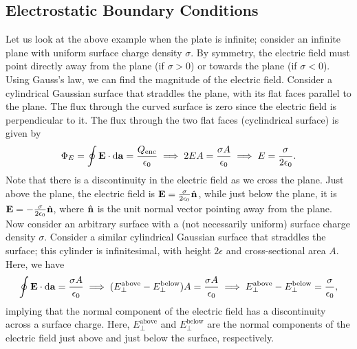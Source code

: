 \subsection{Electrostatic Boundary Conditions}

Let us look at the above example when the plate is infinite; consider an infinite plane with uniform surface charge density $\sigma$. By symmetry, the electric field must point directly away from the plane (if $\sigma > 0$) or towards the plane (if $\sigma < 0$). Using Gauss's law, we can find the magnitude of the electric field. Consider a cylindrical Gaussian surface that straddles the plane, with its flat faces parallel to the plane. The flux through the curved surface is zero since the electric field is perpendicular to it. The flux through the two flat faces (cyclindrical surface) is given by
\begin{align}
    \Phi_{E} = \oint \mathbf{E} \cdot \mathrm{d}\mathbf{a} = \frac{Q_{\text{enc}}}{\epsilon_{0}} \implies 2 E A = \frac{\sigma A}{\epsilon_{0}} \implies E = \frac{\sigma}{2 \epsilon_{0}}.
\end{align}
Note that there is a discontinuity in the electric field as we cross the plane. Just above the plane, the electric field is $\mathbf{E} = \frac{\sigma}{2 \epsilon_{0}} \hat{\mathbf{n}}$, while just below the plane, it is $\mathbf{E} = - \frac{\sigma}{2 \epsilon_{0}} \hat{\mathbf{n}}$, where $\hat{\mathbf{n}}$ is the unit normal vector pointing away from the plane.
\\

Now consider an arbitrary surface with a (not necessarily uniform) surface charge density $\sigma$. Consider a similar cylindrical Gaussian surface that straddles the surface; this cylinder is infinitesimal, with height $2 \epsilon$ and cross-sectional area $A$. Here, we have
\begin{align}
    \oint \mathbf{E} \cdot \mathrm{d}\mathbf{a} = \frac{\sigma A}{\epsilon_{0}} \implies (E_{\perp}^{\text{above}} - E_{\perp}^{\text{below}}) A = \frac{\sigma A}{\epsilon_{0}} \implies E_{\perp}^{\text{above}} - E_{\perp}^{\text{below}} = \frac{\sigma}{\epsilon_{0}},
\end{align}
implying that the normal component of the electric field has a discontinuity across a surface charge. Here, $E_{\perp}^{\text{above}}$ and $E_{\perp}^{\text{below}}$ are the normal components of the electric field just above and just below the surface, respectively.

